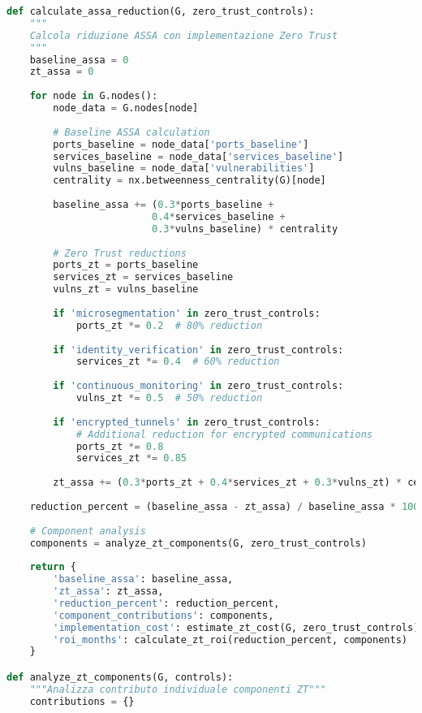 \begin{lstlisting}[language=Python, caption=Quantificazione Impatto Zero Trust su ASSA]
def calculate_assa_reduction(G, zero_trust_controls):
    """
    Calcola riduzione ASSA con implementazione Zero Trust
    """
    baseline_assa = 0
    zt_assa = 0
    
    for node in G.nodes():
        node_data = G.nodes[node]
        
        # Baseline ASSA calculation
        ports_baseline = node_data['ports_baseline']
        services_baseline = node_data['services_baseline']
        vulns_baseline = node_data['vulnerabilities']
        centrality = nx.betweenness_centrality(G)[node]
        
        baseline_assa += (0.3*ports_baseline + 
                         0.4*services_baseline + 
                         0.3*vulns_baseline) * centrality
        
        # Zero Trust reductions
        ports_zt = ports_baseline
        services_zt = services_baseline
        vulns_zt = vulns_baseline
        
        if 'microsegmentation' in zero_trust_controls:
            ports_zt *= 0.2  # 80% reduction
            
        if 'identity_verification' in zero_trust_controls:
            services_zt *= 0.4  # 60% reduction
            
        if 'continuous_monitoring' in zero_trust_controls:
            vulns_zt *= 0.5  # 50% reduction
            
        if 'encrypted_tunnels' in zero_trust_controls:
            # Additional reduction for encrypted communications
            ports_zt *= 0.8
            services_zt *= 0.85
        
        zt_assa += (0.3*ports_zt + 0.4*services_zt + 0.3*vulns_zt) * centrality
    
    reduction_percent = (baseline_assa - zt_assa) / baseline_assa * 100
    
    # Component analysis
    components = analyze_zt_components(G, zero_trust_controls)
    
    return {
        'baseline_assa': baseline_assa,
        'zt_assa': zt_assa,
        'reduction_percent': reduction_percent,
        'component_contributions': components,
        'implementation_cost': estimate_zt_cost(G, zero_trust_controls),
        'roi_months': calculate_zt_roi(reduction_percent, components)
    }

def analyze_zt_components(G, controls):
    """Analizza contributo individuale componenti ZT"""
    contributions = {}
    

\end{lstlisting}
